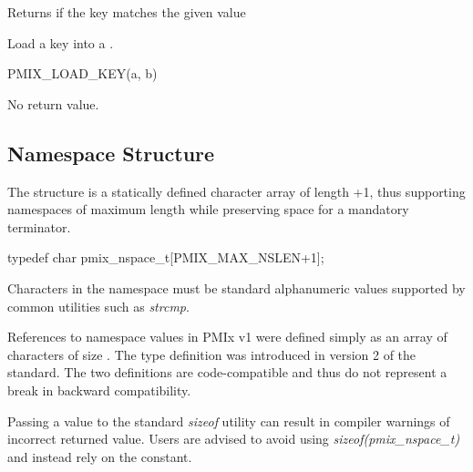 \begin{arglist}
\end{arglist}

Returns  if the key matches the given value


Load a key into a .

\cspecificstart
\begin{codepar}
PMIX_LOAD_KEY(a, b)
\end{codepar}
\cspecificend

\begin{arglist}
\end{arglist}

No return value.

\subsection{Namespace Structure}

The  structure is a statically defined character array of length +1, thus supporting namespaces of maximum length  while preserving space for a mandatory  terminator.

\cspecificstart
\begin{codepar}
typedef char pmix_nspace_t[PMIX_MAX_NSLEN+1];
\end{codepar}
\cspecificend

Characters in the namespace must be standard alphanumeric values supported by common utilities such as \textit{strcmp}.

\adviceuserstart
References to namespace values in \ac{PMIx} v1 were defined simply as an array of characters of size . The  type definition was introduced in version 2 of the standard. The two definitions are code-compatible and thus do not represent a break in backward compatibility.

Passing a  value to the standard \textit{sizeof} utility can result in compiler warnings of incorrect returned value. Users are advised to avoid using \textit{sizeof(pmix_nspace_t)} and instead rely on the  constant.
\adviceuserend

